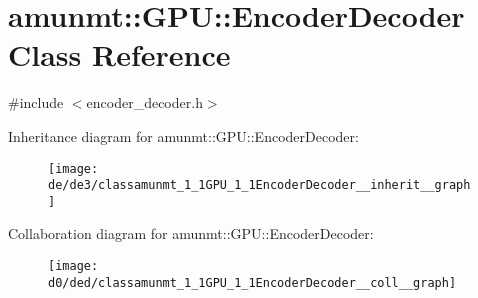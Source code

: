 \hypertarget{classamunmt_1_1GPU_1_1EncoderDecoder}{}\section{amunmt\+:\+:G\+PU\+:\+:Encoder\+Decoder Class Reference}
\label{classamunmt_1_1GPU_1_1EncoderDecoder}


{\ttfamily \#include $<$encoder\+\_\+decoder.\+h$>$}



Inheritance diagram for amunmt\+:\+:G\+PU\+:\+:Encoder\+Decoder\+:
\nopagebreak
\begin{figure}[H]
\begin{center}
\leavevmode
\texttt{[image: de/de3/classamunmt\_1\_1GPU\_1\_1EncoderDecoder\_\_inherit\_\_graph]}
\end{center}
\end{figure}


Collaboration diagram for amunmt\+:\+:G\+PU\+:\+:Encoder\+Decoder\+:
\nopagebreak
\begin{figure}[H]
\begin{center}
\leavevmode
\texttt{[image: d0/ded/classamunmt\_1\_1GPU\_1\_1EncoderDecoder\_\_coll\_\_graph]}
\end{center}
\end{figure}
